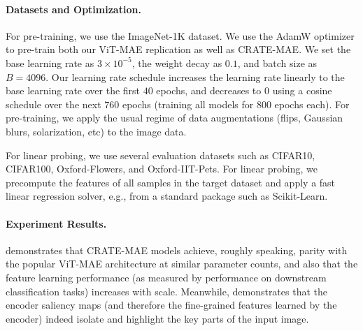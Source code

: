 \documentclass[../../book-main.tex]{subfiles}
\begin{document}
\paragraph{Datasets and Optimization.} For pre-training, we use the
ImageNet-1K dataset. We use the AdamW optimizer to pre-train both our
ViT-MAE replication as well as CRATE-MAE. We set the base learning
rate as \(3 \times 10^{-5}\), the weight decay as \(0.1\), and batch
size as \(B = 4096\). Our learning rate schedule increases the
learning rate linearly to the base learning rate over the first
\(40\) epochs, and decreases to \(0\) using a cosine schedule over
the next \(760\) epochs (training all models for \(800\) epochs
each). For pre-training, we apply the usual regime of data
augmentations (flips, Gaussian blurs, solarization, etc) to the image data.

For linear probing, we use several evaluation datasets such as
CIFAR10, CIFAR100, Oxford-Flowers, and Oxford-IIT-Pets. For linear
probing, we precompute the features of all samples in the target
dataset and apply a fast linear regression solver, e.g., from a
standard package such as Scikit-Learn.

\paragraph{Experiment Results.} 
demonstrates that CRATE-MAE models achieve, roughly speaking, parity
with the popular ViT-MAE architecture at similar parameter counts,
and also that the feature learning performance (as measured by
performance on downstream classification tasks) increases with scale.
Meanwhile,  demonstrates that the
encoder saliency maps (and therefore the fine-grained features
learned by the encoder) indeed isolate and highlight the key parts of
the input image.
\end{document}
